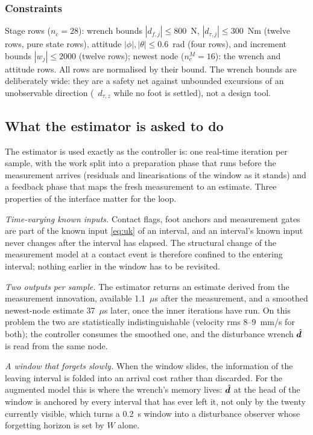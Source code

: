 \documentclass[11pt]{article}
\begin{document}
\subsubsection{Constraints}
Stage rows ($n_c=28$): wrench bounds $|d_{f,j}|\le800$~N, $|d_{\tau,j}|\le300$~Nm (twelve rows, pure state rows), attitude $|\phi|,|\theta|\le0.6$~rad (four rows), and increment bounds $|w_j|\le2000$ (twelve rows); newest node ($n_c^M=16$): the wrench and attitude rows. All rows are normalised by their bound. The wrench bounds are deliberately wide: they are a safety net against unbounded excursions of an unobservable direction (\eg\ $d_{\tau,z}$ while no foot is settled), not a design tool.

\subsection{What the estimator is asked to do}
The estimator is used exactly as the controller is: one real-time iteration per sample, with the work split into a preparation phase that runs before the measurement arrives (residuals and linearisations of the window as it stands) and a feedback phase that maps the fresh measurement to an estimate. Three properties of the interface matter for the loop.

\emph{Time-varying known inputs.} Contact flags, foot anchors and measurement gates are part of the known input \eqref{eq:uk} of an interval, and an interval's known input never changes after the interval has elapsed. The structural change of the measurement model at a contact event is therefore confined to the entering interval; nothing earlier in the window has to be revisited.

\emph{Two outputs per sample.} The estimator returns an estimate derived from the measurement innovation, available 1.1~$\mu$s after the measurement, and a smoothed newest-node estimate 37~$\mu$s later, once the inner iterations have run. On this problem the two are statistically indistinguishable (velocity rms 8--9~mm/s for both); the controller consumes the smoothed one, and the disturbance wrench $\hat{\bm{d}}$ is read from the same node.

\emph{A window that forgets slowly.} When the window slides, the information of the leaving interval is folded into an arrival cost rather than discarded. For the augmented model this is where the wrench's memory lives: $\hat{\bm{d}}$ at the head of the window is anchored by every interval that has ever left it, not only by the twenty currently visible, which turns a 0.2~s window into a disturbance observer whose forgetting horizon is set by $W$ alone.
\end{document}
